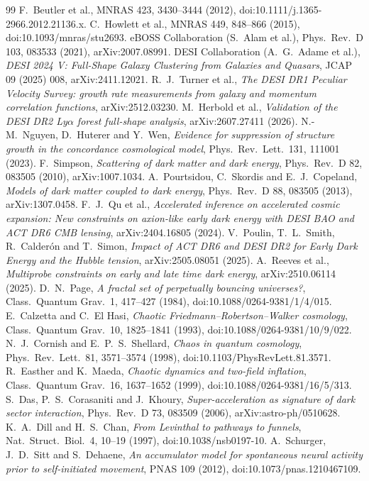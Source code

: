 \documentclass[11pt]{article}
\theoremstyle{definition}
\theoremstyle{remark}
\begin{document}
\begin{thebibliography}{99}
 F.~Beutler et al., MNRAS 423, 3430--3444 (2012), doi:10.1111/j.1365-2966.2012.21136.x.
 C.~Howlett et al., MNRAS 449, 848--866 (2015), doi:10.1093/mnras/stu2693.
 eBOSS Collaboration (S.~Alam et al.), Phys.\ Rev.\ D 103, 083533 (2021), arXiv:2007.08991.
 DESI Collaboration (A.~G.~Adame et al.), \emph{DESI 2024 V: Full-Shape Galaxy Clustering from Galaxies and Quasars}, JCAP 09 (2025) 008, arXiv:2411.12021.
 R.~J.~Turner et al., \emph{The DESI DR1 Peculiar Velocity Survey: growth rate measurements from galaxy and momentum correlation functions}, arXiv:2512.03230.
 M.~Herbold et al., \emph{Validation of the DESI DR2 Ly$\alpha$ forest full-shape analysis}, arXiv:2607.27411 (2026).
 N.-M.~Nguyen, D.~Huterer and Y.~Wen, \emph{Evidence for suppression of structure growth in the concordance cosmological model}, Phys.\ Rev.\ Lett.\ 131, 111001 (2023).
 F.~Simpson, \emph{Scattering of dark matter and dark energy}, Phys.\ Rev.\ D 82, 083505 (2010), arXiv:1007.1034.
 A.~Pourtsidou, C.~Skordis and E.~J.~Copeland, \emph{Models of dark matter coupled to dark energy}, Phys.\ Rev.\ D 88, 083505 (2013), arXiv:1307.0458.
 F.~J.~Qu et al., \emph{Accelerated inference on accelerated cosmic expansion: New constraints on axion-like early dark energy with DESI BAO and ACT DR6 CMB lensing}, arXiv:2404.16805 (2024).
 V.~Poulin, T.~L.~Smith, R.~Calder\'on and T.~Simon, \emph{Impact of ACT DR6 and DESI DR2 for Early Dark Energy and the Hubble tension}, arXiv:2505.08051 (2025).
 A.~Reeves et al., \emph{Multiprobe constraints on early and late time dark energy}, arXiv:2510.06114 (2025).
 D.~N.~Page, \emph{A fractal set of perpetually bouncing universes?}, Class.\ Quantum Grav.\ 1, 417--427 (1984), doi:10.1088/0264-9381/1/4/015.
 E.~Calzetta and C.~El Hasi, \emph{Chaotic Friedmann--Robertson--Walker cosmology}, Class.\ Quantum Grav.\ 10, 1825--1841 (1993), doi:10.1088/0264-9381/10/9/022.
 N.~J.~Cornish and E.~P.~S.~Shellard, \emph{Chaos in quantum cosmology}, Phys.\ Rev.\ Lett.\ 81, 3571--3574 (1998), doi:10.1103/PhysRevLett.81.3571.
 R.~Easther and K.~Maeda, \emph{Chaotic dynamics and two-field inflation}, Class.\ Quantum Grav.\ 16, 1637--1652 (1999), doi:10.1088/0264-9381/16/5/313.
 S.~Das, P.~S.~Corasaniti and J.~Khoury, \emph{Super-acceleration as signature of dark sector interaction}, Phys.\ Rev.\ D 73, 083509 (2006), arXiv:astro-ph/0510628.
 K.~A.~Dill and H.~S.~Chan, \emph{From Levinthal to pathways to funnels}, Nat.\ Struct.\ Biol.\ 4, 10--19 (1997), doi:10.1038/nsb0197-10.
 A.~Schurger, J.~D.~Sitt and S.~Dehaene, \emph{An accumulator model for spontaneous neural activity prior to self-initiated movement}, PNAS 109 (2012), doi:10.1073/pnas.1210467109.
\end{thebibliography}
\end{document}
